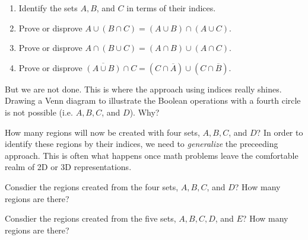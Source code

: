\begin{problem}
\begin{center}
\end{center}
\begin{enumerate}
\item Identify the sets $A, B$, and $C$ in terms of their indices.
\item Prove or disprove $A \cup(B\cap C) = (A\cup B) \cap (A \cup C)$.
\item Prove or disprove $A \cap(B\cup C) = (A\cap B) \cup (A \cap C)$.
\item Prove or disprove $\overline{(A\cup B)}\cap C = (C\cap \overline{A}) \cup (C \cap \overline{B})$.
\end{enumerate}
\end{problem}
But we are not done.  This is where the approach using indices really shines.  Drawing a Venn diagram to illustrate the Boolean operations with a fourth circle is not possible (i.e. $A, B, C$, and $D$).  Why?

How many regions will now be created with four sets, $A, B, C$, and $D$?
In order to identify these regions by their indices, we need to \emph{generalize} the preceeding approach.  This is often what happens once math problems leave the comfortable realm of 2D or 3D representations.

\begin{problem}
Consdier the regions created from the four sets, $A, B, C$, and $D$?  How many regions are there?

\end{problem}


\begin{problem}
Consdier the regions created from the five sets, $A, B, C, D$, and $E$?  How many regions are there?
\end{problem}

